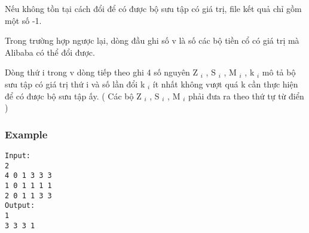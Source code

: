 Nếu không tồn tại cách đổi để có được bộ sưu tập có giá trị, file kết quả chỉ gồm một số -1.

Trong trường hợp ngược lại, dòng đầu ghi số v là số các bộ tiền cổ có giá trị mà Alibaba có thể đổi được.

Dòng thứ i trong v dòng tiếp theo ghi 4 số nguyên Z $_ i $ , S $_ i $ , M $_ i $ , k $_ i $ mô tả bộ sưu tập có giá trị thứ i và số lần đổi k $_ i $ ít nhất không vượt quá k cần thực hiện để có được bộ sưu tập ấy. ( Các bộ Z $_ i $ , S $_ i $ , M $_ i $ phải đưa ra theo thứ tự từ điển )

\subsubsection{Example}
\begin{verbatim}
Input:
2
4 0 1 3 3 3
1 0 1 1 1 1
2 0 1 1 3 3
Output:
1
3 3 3 1
\end{verbatim}
